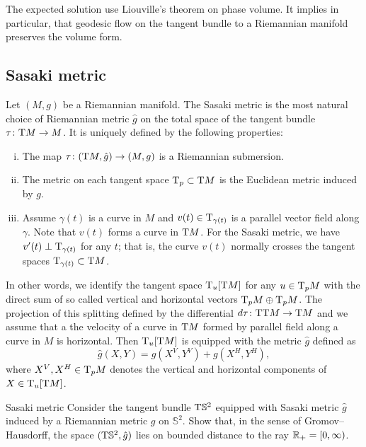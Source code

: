 The expected solution use Liouville's theorem on phase volume.
It implies in particular, that geodesic flow on the tangent bundle to a Riemannian manifold preserves the volume form.


\subsection*{Sasaki metric}

Let $(M,g)$ be a Riemannian manifold.
The Sasaki metric is the most natural choice of Riemannian metric $\hat g$ on the total space of the tangent bundle $\tau\colon\mathrm{T} M\to M$.
It is uniquely defined by the following properties:
\begin{enumerate}[(i)]
\item The map $\tau\colon(\mathrm{T} M,\hat g)\to (M,g)$ is a Riemannian submersion.
\item The metric on each tangent space $\mathrm{T}_p\subset \mathrm{T} M$ is the Euclidean metric induced by $g$.
\item Assume $\gamma(t)$ is a curve in $M$ and $v(t)\in\mathrm{T}_{\gamma(t)}$ is a parallel vector field along $\gamma$. 
Note that $v(t)$ forms a curve in $\mathrm{T} M$.
For the Sasaki metric, we have $v'(t)\perp \mathrm{T}_{\gamma(t)}$ for any $t$;
that is, the curve $v(t)$ normally crosses the tangent spaces $\mathrm{T}_{\gamma(t)}\subset \mathrm{T} M$.
\end{enumerate}

In other words, we identify the tangent space 
$\mathrm{T}_u[\mathrm{T} M]$ for any $u\in \mathrm{T}_p M$ with the direct sum of so called vertical and horizontal vectors $\mathrm{T}_p M\oplus \mathrm{T}_p M$.
The projection of this splitting defined by the differential $d\tau\colon\mathrm{T}\mathrm{T} M\to \mathrm{T} M$
and we assume that a the velocity of a curve in $\mathrm{T} M$ formed by parallel field along a curve in $M$ is horizontal.
Then $\mathrm{T}_u[\mathrm{T} M]$ is equipped with the metric $\hat g$ defined as 
\[\hat g(X,Y)=g(X^V,Y^V)+g(X^H,Y^H),\]
where $X^V,X^H\in\mathrm{T}_pM$ denotes the vertical and horizontal components of $X\in\mathrm{T}_u[\mathrm{T} M]$.



\begin{pr}{}{Sasaki metric}\label{pr:Sasaki metric}
Consider the tangent bundle $\mathrm{T} \mathbb{S}^2$ 
equipped with Sasaki metric $\hat g$ induced by a Riemannian metric $g$ on $\mathbb{S}^2$.
Show that, in the sense of Gromov--Hausdorff,
the space $(\mathrm{T} \mathbb{S}^2, \hat g)$ lies on bounded distance to the ray $\mathbb{R}_+=[0,\infty)$.
\end{pr}



